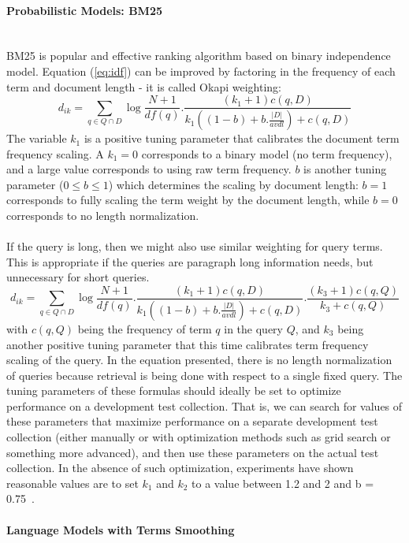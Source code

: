 \paragraph{Probabilistic Models: BM25}
\ \\
BM25 is popular and effective ranking algorithm based on binary independence model. Equation (\ref{eq:idf}) can be improved by factoring in the frequency of each term and document length - it is called Okapi weighting:
\begin{equation}
d_{ik}=\sum\limits_{q \in Q\cap D}\log\frac{N+1}{df(q)}.\frac{(k_{1}+1)c(q,D)}{k_{1}((1-b)+b.\frac{|D|}{avdl})+c(q,D)}
\label{eq:idfbm25}
\end{equation}
The variable $ k_{1} $ is a positive tuning parameter that calibrates the document term frequency scaling. A $ k_{1}=0 $  corresponds to a binary model (no term frequency), and a large value corresponds to using raw term
frequency. $ b $ is another tuning parameter ($ 0 \leq b \leq 1 $) which determines the scaling by document length: $ b = 1 $ corresponds to fully scaling the term weight by the document length, while $ b = 0 $ corresponds to no length normalization. \\\\
If the query is long, then we might also use similar weighting for query terms. This is appropriate if the queries are paragraph long information needs, but unnecessary for short queries.
\begin{equation}
d_{ik}=\sum\limits_{q \in Q\cap D}\log\frac{N+1}{df(q)}.\frac{(k_{1}+1)c(q,D)}{k_{1}((1-b)+b.\frac{|D|}{avdl})+c(q,D)}.\frac{(k_{3}+1)c(q,Q)}{k_{3}+c(q,Q)}
\label{eq:idfbm25}
\end{equation}
with $ c(q,Q) $ being the frequency of term $ q $ in the query $ Q $, and $ k_{3} $ being another positive tuning parameter that this time calibrates term frequency scaling of the query. In the equation presented, there is no length normalization of
queries because retrieval is being done with respect to a single fixed query. The tuning parameters of these formulas should ideally be set to optimize performance on a development test collection. That is, we can search for values of these parameters that maximize performance on a separate development test collection (either manually or with optimization methods such as grid search or something more advanced), and then use these parameters on the actual test collection. In the absence of such optimization, experiments have shown reasonable values are to set $ k_{1} $ and $ k_{2} $ to a value between 1.2 and 2 and b = 0.75~\citep{manning2008introduction}.

\paragraph{Language Models with Terms Smoothing}
\ \\
